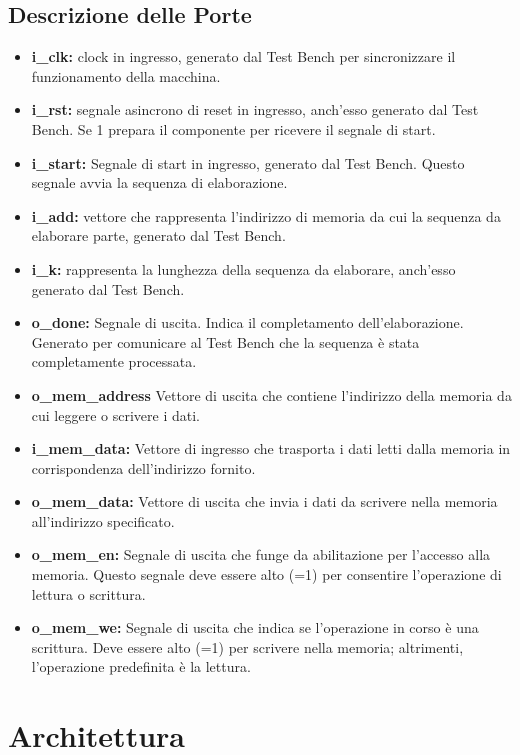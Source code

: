 \documentclass[12pt]{article}
\begin{document}
\subsection{Descrizione delle Porte}
\label{PortDescription}
\begin{itemize}
    \item \textbf{i\_clk:} clock in ingresso, generato dal Test Bench per sincronizzare il funzionamento della macchina.
    \item \textbf{i\_rst:} segnale asincrono di reset in ingresso, anch'esso generato dal Test Bench. Se 1 prepara il componente per ricevere il segnale di start.
    \item \textbf{i\_start:} Segnale di start in ingresso, generato dal Test Bench. Questo segnale avvia la sequenza di elaborazione.
    \item \textbf{i\_add:} vettore che rappresenta l'indirizzo di memoria da cui la sequenza da elaborare parte, generato dal Test Bench.
    \item \textbf{i\_k:} rappresenta la lunghezza della sequenza da elaborare, anch'esso generato dal Test Bench.
    \item \textbf{o\_done:} Segnale di uscita. Indica il completamento dell'elaborazione. Generato per comunicare al Test Bench che la sequenza è stata completamente processata.
    \item \textbf{o\_mem\_address} Vettore di uscita che contiene l'indirizzo della memoria da cui leggere o scrivere i dati.
    \item \textbf{i\_mem\_data:} Vettore di ingresso che trasporta i dati letti dalla memoria in corrispondenza dell'indirizzo fornito.
    \item \textbf{o\_mem\_data:} Vettore di uscita che invia i dati da scrivere nella memoria all'indirizzo specificato.
    \item \textbf{o\_mem\_en:} Segnale di uscita che funge da abilitazione per l'accesso alla memoria. Questo segnale deve essere alto (=1) per consentire l'operazione di lettura o scrittura.
    \item \textbf{o\_mem\_we:} Segnale di uscita che indica se l'operazione in corso è una scrittura. Deve essere alto (=1) per scrivere nella memoria; altrimenti, l'operazione predefinita è la lettura.
\end{itemize}

\newpage
\section{Architettura}
\end{document}
